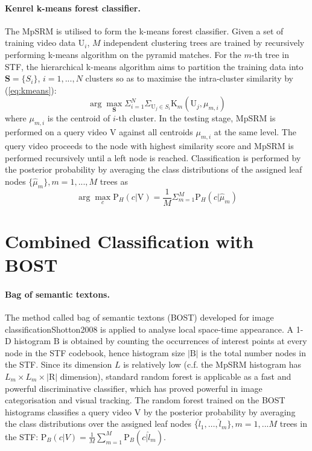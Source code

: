 \paragraph{Kenrel k-means forest classifier.}
The MpSRM is utilised to form the k-means forest classifier. Given a set of training video data $\mathrm{U}_i$, $M$ independent clustering trees are trained by recursively performing k-means algorithm on the pyramid matches. For the $m$-th tree in STF, the hierarchical k-means algorithm aims to partition the training data into $\mathbf{S}=\{S_i\}$, $i=1,...,N$ clusters so as to maximise the intra-cluster similarity by (\ref{eq:kmeans}):
\begin{equation}
\arg\max_{\mathbf{S}} \Sigma_{i = 1}^{N}\Sigma_{\mathrm{U}_j \in S_{i}} \mathrm{K}_m(\mathrm{U}_j, \mu_{m,i})
\label{eq:kmeans}
\end{equation}
where $\mu_{m,i}$ is the centroid of $i$-th cluster. In the testing stage, MpSRM is performed on a query video $\mathrm{V}$ against all centroids $\mu_{m,i}$ at the same level. The query video proceeds to the node with highest similarity score and MpSRM is performed recursively until a left node is reached. Classification is performed by the posterior probability by averaging the class distributions of the assigned leaf nodes $\{ \hat{\mu}_m \}, m=1,...,M$ trees as
\begin{equation}
\arg\max_{c}\mathrm{P}_{H}(c|\mathrm{V}) = \frac{1}{M}\Sigma_{m=1}^{M}\mathrm{P}_{H}(c|\hat{\mu}_{m})
\end{equation}

\section{Combined Classification with BOST}
\label{sec:combine}

\paragraph{Bag of semantic textons.}
The method called bag of semantic textons (BOST) developed for image classification{Shotton2008} is applied to analyse local space-time appearance. A 1-D histogram $\mathrm{B}$ is obtained by counting the occurrences of interest points at every node in the STF codebook, hence histogram size $|\mathrm{B}|$ is the total number nodes in the STF. Since its dimension $L$ is relatively low (c.f. the MpSRM histogram has $L_m \times L_m \times |\mathrm{R}|$ dimension), standard random forest \cite{Breiman2001} is applicable as a fast and powerful discriminative classifier, which has proved powerful in image categorisation and visual tracking. The random forest trained on the BOST histograms classifies a query video $\mathrm{V}$ by the posterior probability by averaging the class distributions over the assigned leaf nodes $\{\hat{l}_1,\dots,\hat{l}_{m}\}, m=1,...M$ trees in the STF: $\mathrm{P}_{B}(c|V) = \frac{1}{M}\sum_{m=1}^{M}\mathrm{P}_{B}(c|\hat{l}_m)$.

